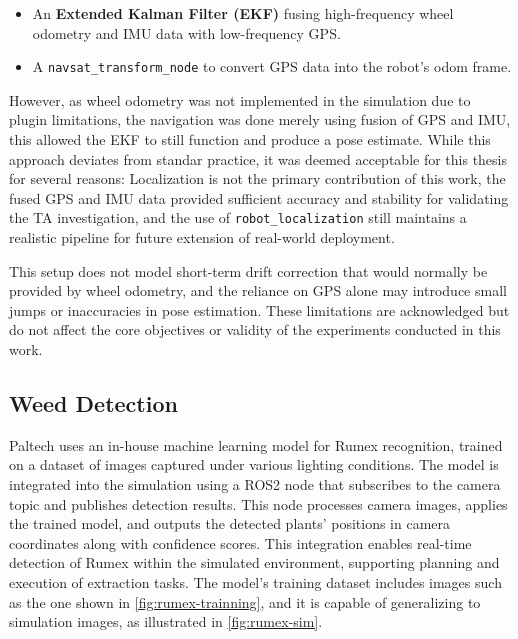 \begin{itemize}
    \item An \textbf{Extended Kalman Filter (EKF)} fusing high-frequency wheel odometry and IMU data with low-frequency GPS.
    \item A \texttt{navsat\_transform\_node} to convert GPS data into the robot's odom frame.
\end{itemize}

However, as wheel odometry was not implemented in the simulation due to plugin limitations, the navigation was done merely using fusion of GPS and IMU, this allowed the EKF to still function and produce a pose estimate. While this approach deviates from standar practice, it was deemed acceptable for this thesis for several reasons: Localization is not the primary contribution of this work, the fused GPS and IMU data provided sufficient accuracy and stability for validating the \ac{TA} investigation, and the use of \texttt{robot\_localization} still maintains a realistic pipeline for future extension of real-world deployment.

This setup does not model short-term drift correction that would normally be provided by wheel odometry, and the reliance on GPS alone may introduce small jumps or inaccuracies in pose estimation. These limitations are acknowledged but do not affect the core objectives or validity of the experiments conducted in this work.

\subsection{Weed Detection}
Paltech uses an in-house machine learning model for Rumex recognition, trained on a dataset of images captured under various lighting conditions. The model is integrated into the simulation using a ROS2 node that subscribes to the camera topic and publishes detection results. This node processes camera images, applies the trained model, and outputs the detected plants’ positions in camera coordinates along with confidence scores. This integration enables real-time detection of Rumex within the simulated environment, supporting planning and execution of extraction tasks. The model’s training dataset includes images such as the one shown in \autoref{fig:rumex-trainning}, and it is capable of generalizing to simulation images, as illustrated in \autoref{fig:rumex-sim}.

